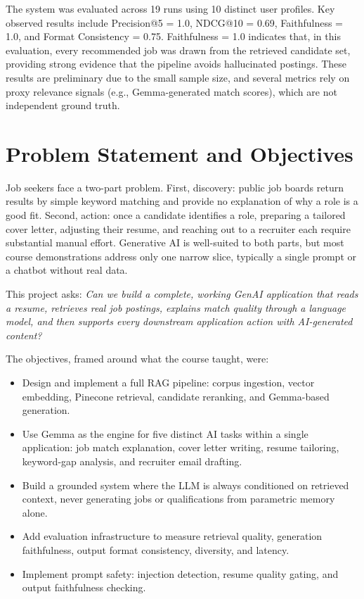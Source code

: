 \documentclass[11pt]{article}
\begin{document}
The system was evaluated across 19 runs using 10 distinct user profiles. Key observed results include Precision@5 = 1.0, NDCG@10 = 0.69, Faithfulness = 1.0, and Format Consistency = 0.75. Faithfulness = 1.0 indicates that, in this evaluation, every recommended job was drawn from the retrieved candidate set, providing strong evidence that the pipeline avoids hallucinated postings. These results are preliminary due to the small sample size, and several metrics rely on proxy relevance signals (e.g., Gemma-generated match scores), which are not independent ground truth.

\section{Problem Statement and Objectives}

Job seekers face a two-part problem. First, discovery: public job boards return results by simple keyword matching and provide no explanation of why a role is a good fit. Second, action: once a candidate identifies a role, preparing a tailored cover letter, adjusting their resume, and reaching out to a recruiter each require substantial manual effort. Generative AI is well-suited to both parts, but most course demonstrations address only one narrow slice, typically a single prompt or a chatbot without real data.

This project asks: \textit{Can we build a complete, working GenAI application that reads a resume, retrieves real job postings, explains match quality through a language model, and then supports every downstream application action with AI-generated content?}

The objectives, framed around what the course taught, were:

\begin{itemize}
  \item Design and implement a full RAG pipeline: corpus ingestion, vector embedding, Pinecone retrieval, candidate reranking, and Gemma-based generation.
  \item Use Gemma as the engine for five distinct AI tasks within a single application: job match explanation, cover letter writing, resume tailoring, keyword-gap analysis, and recruiter email drafting.
  \item Build a grounded system where the LLM is always conditioned on retrieved context, never generating jobs or qualifications from parametric memory alone.
  \item Add evaluation infrastructure to measure retrieval quality, generation faithfulness, output format consistency, diversity, and latency.
  \item Implement prompt safety: injection detection, resume quality gating, and output faithfulness checking.
\end{itemize}
\end{document}
